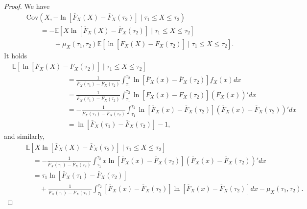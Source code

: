 \documentclass[10pt,a4paper]{amsart}
\begin{document}
\begin{proof} 
	We have
	\begin{align}
		&\mathrm{Cov}\left(X, -\ln[\overline{F}_X(X)-\overline{F}_X(\tau_2)] \mid \tau_1 \leq X \leq \tau_2 \right) \nonumber \\
		& \textstyle \qquad = -\mathbb{E}[X \ln[\overline{F}_X(X)-\overline{F}_X(\tau_2)] \mid \tau_1 \leq X \leq \tau_2] \nonumber \\
		& \textstyle \qquad \qquad + \mu_X(\tau_1,\tau_2) \mathbb{E}[\ln[\overline{F}_X(X)-\overline{F}_X(\tau_2)] \mid \tau_1 \leq X \leq \tau_2].
	\end{align}
	It holds
	\begin{align}
		& \mathbb{E}[\ln[\overline{F}_X(X)-\overline{F}_X(\tau_2)] \mid \tau_1 \leq X \leq \tau_2] \nonumber \\
		& \textstyle \qquad \qquad \qquad \qquad = \frac{1}{\overline{F}_X(\tau_1)-\overline{F}_X(\tau_2)} \int_{\tau_1}^{\tau_2} \ln[\overline{F}_X(x)-\overline{F}_X(\tau_2)] f_X(x) dx \nonumber \\
		& \textstyle \qquad \qquad \qquad \qquad = \frac{1}{\overline{F}_X(\tau_1)-\overline{F}_X(\tau_2)} \int_{\tau_1}^{\tau_2} \ln[\overline{F}_X(x)-\overline{F}_X(\tau_2)] (\overline{F}_X(x))' dx \nonumber \\
		& \textstyle \qquad \qquad \qquad \qquad = -\frac{1}{\overline{F}_X(\tau_1)-\overline{F}_X(\tau_2)} \int_{\tau_1}^{\tau_2} \ln[\overline{F}_X(x)-\overline{F}_X(\tau_2)] (\overline{F}_X(x)-\overline{F}_X(\tau_2))' dx \nonumber \\
		& \textstyle \qquad \qquad \qquad \qquad = \ln[\overline{F}_X(\tau_1)-\overline{F}_X(\tau_2)] - 1,
	\end{align}
	and similarly,
	\begin{align}
		& \qquad \mathbb{E}[X \ln[\overline{F}_X(X)-\overline{F}_X(\tau_2)] \mid \tau_1 \leq X \leq \tau_2] \nonumber \\
		& \textstyle \qquad \quad = -\frac{1}{\overline{F}_X(\tau_1)-\overline{F}_X(\tau_2)} \int_{\tau_1}^{\tau_2} x \ln[\overline{F}_X(x)-\overline{F}_X(\tau_2)] (\overline{F}_X(x)-\overline{F}_X(\tau_2))' dx \nonumber \\
		& \textstyle \qquad \quad = \tau_1 \ln[\overline{F}_X(\tau_1)-\overline{F}_X(\tau_2)] \nonumber \\
		& \textstyle \qquad \qquad + \frac{1}{\overline{F}_X(\tau_1)-\overline{F}_X(\tau_2)} \int_{\tau_1}^{\tau_2} [\overline{F}_X(x)-\overline{F}_X(\tau_2)] \ln[\overline{F}_X(x)-\overline{F}_X(\tau_2)] dx - \mu_X(\tau_1,\tau_2).

\end{align}
\end{proof}
\end{document}

